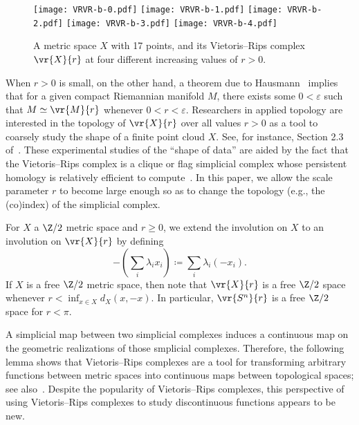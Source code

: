 \documentclass[11pt, reqno, english]{amsart}
\begin{document}
\begin{figure}[h]
\texttt{[image: VRVR-b-0.pdf]}
\hspace{0.15in}
\texttt{[image: VRVR-b-1.pdf]}
\hspace{0.15in}
\texttt{[image: VRVR-b-2.pdf]}
\hspace{0.15in}
\texttt{[image: VRVR-b-3.pdf]}
\hspace{0.15in}
\texttt{[image: VRVR-b-4.pdf]}
\captionsetup{width=1\textwidth}
\caption{A metric space $X$ with 17 points, and its Vietoris--Rips complex $\vr{X}{r}$ at four different increasing values of $r>0$.}
\label{fig:VR}
\end{figure}

When $r>0$ is small, on the other hand,
a theorem due to Hausmann~\cite{Hausmann1995} implies that for a given compact Riemannian manifold $M$, there exists some $0<\varepsilon$ such that $M\simeq \vr{M}{r}$ whenever $0<r<\varepsilon$.
Researchers in applied topology are interested in the topology of $\vr{X}{r}$ over all values $r>0$ as a tool to coarsely study the shape of a finite point cloud $X$.
See, for instance, Section 2.3 of~\cite{Carlsson2009}.
These experimental studies of the ``shape of data'' are aided by the fact that the Vietoris--Rips complex is a clique or flag simplicial complex whose persistent homology is relatively efficient to compute~\cite{bauer2021ripser}.
In this paper, we allow the scale parameter $r$ to become large enough so as to change the topology (e.g., the (co)index) of the simplicial complex.

For $X$ a $\Z/2$ metric space and $r\geq 0$, we extend the involution on $X$ to an involution on $\vr{X}{r}$ by defining
\[ \textstyle{
-\left(\sum_i \lambda_i x_i\right)\coloneqq \sum_i\lambda_i (-x_i).
} \]
If $X$ is a free $\Z/2$ metric space, then note that $\vr{X}{r}$ is a free $\Z/2$ space whenever $r<\inf_{x\in X}d_X(x,-x)$.
In particular, $\vr{S^n}{r}$ is a free $\Z/2$ space for $r<\pi$.

A simplicial map between two simplicial complexes induces a continuous map on the geometric realizations of those smplicial complexes.
Therefore, the following lemma shows that Vietoris--Rips complexes are a tool for transforming arbitrary functions between metric spaces into continuous maps between topological spaces; see also~\cite[Lemma~4.3]{ChazalDeSilvaOudot2014}.
Despite the popularity of Vietoris--Rips complexes, this perspective of using Vietoris--Rips complexes to study discontinuous functions appears to be new.
\end{document}
